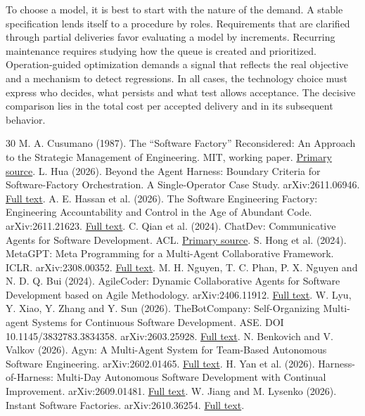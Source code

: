 \documentclass[11pt,a4paper]{article}
\newcommand{\paperlink}[1]{\href{https://www.alphaxiv.org/pdf/#1}{Full text}}
\begin{document}
To choose a model, it is best to start with the nature of the demand. A stable specification lends itself to a procedure by roles. Requirements that are clarified through partial deliveries favor evaluating a model by increments. Recurring maintenance requires studying how the queue is created and prioritized. Operation-guided optimization demands a signal that reflects the real objective and a mechanism to detect regressions. In all cases, the technology choice must express who decides, what persists and what test allows acceptance. The decisive comparison lies in the total cost per accepted delivery and in its subsequent behavior.
\begin{thebibliography}{30}\small
{} M. A. Cusumano (1987). The ``Software Factory'' Reconsidered: An Approach to the Strategic Management of Engineering. MIT, working paper. \href{https://hdl.handle.net/1721.1/11025}{Primary source}.
 L. Hua (2026). Beyond the Agent Harness: Boundary Criteria for Software-Factory Orchestration. A Single-Operator Case Study. arXiv:2611.06946. \paperlink{2611.06946}.
 A. E. Hassan et al. (2026). The Software Engineering Factory: Engineering Accountability and Control in the Age of Abundant Code. arXiv:2611.21623. \paperlink{2611.21623}.
 C. Qian et al. (2024). ChatDev: Communicative Agents for Software Development. ACL. \href{https://aclanthology.org/2024.acl-long.810/}{Primary source}.
 S. Hong et al. (2024). MetaGPT: Meta Programming for a Multi-Agent Collaborative Framework. ICLR. arXiv:2308.00352. \paperlink{2308.00352}.
 M. H. Nguyen, T. C. Phan, P. X. Nguyen and N. D. Q. Bui (2024). AgileCoder: Dynamic Collaborative Agents for Software Development based on Agile Methodology. arXiv:2406.11912. \paperlink{2406.11912}.
 W. Lyu, Y. Xiao, Y. Zhang and Y. Sun (2026). TheBotCompany: Self-Organizing Multi-agent Systems for Continuous Software Development. ASE. DOI 10.1145/3832783.3834358. arXiv:2603.25928. \paperlink{2603.25928}.
 N. Benkovich and V. Valkov (2026). Agyn: A Multi-Agent System for Team-Based Autonomous Software Engineering. arXiv:2602.01465. \paperlink{2602.01465}.
 H. Yan et al. (2026). Harness-of-Harness: Multi-Day Autonomous Software Development with Continual Improvement. arXiv:2609.01481. \paperlink{2609.01481}.
 W. Jiang and M. Lysenko (2026). Instant Software Factories. arXiv:2610.36254. \paperlink{2610.36254}.

\end{thebibliography}
\end{document}
